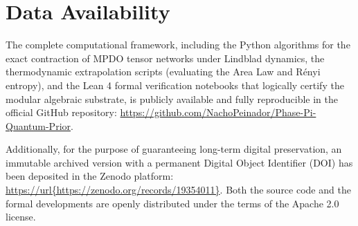 \documentclass[12pt,a4paper]{article}
\theoremstyle{plain}
\theoremstyle{definition}
\theoremstyle{remark}
\begin{document}
\section{Data Availability}
The complete computational framework, including the Python algorithms for the exact contraction of MPDO tensor networks under Lindblad dynamics, the thermodynamic extrapolation scripts (evaluating the Area Law and Rényi entropy), and the Lean 4 formal verification notebooks that logically certify the modular algebraic substrate, is publicly available and fully reproducible in the official GitHub repository: \url{https://github.com/NachoPeinador/Phase-Pi-Quantum-Prior}. 

Additionally, for the purpose of guaranteeing long-term digital preservation, an immutable archived version with a permanent Digital Object Identifier (DOI) has been deposited in the Zenodo platform: \url{https://url{https://zenodo.org/records/19354011}}. Both the source code and the formal developments are openly distributed under the terms of the Apache 2.0 license.
\end{document}
